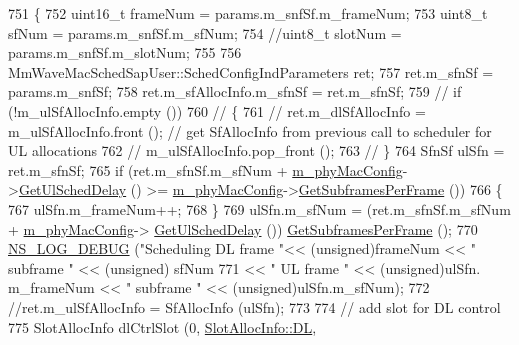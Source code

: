 \begin{DoxyCode}
751 \{
752         uint16\_t frameNum = params.m\_snfSf.m\_frameNum;
753         uint8\_t sfNum = params.m\_snfSf.m\_sfNum;
754         \textcolor{comment}{//uint8\_t slotNum = params.m\_snfSf.m\_slotNum;}
755 
756         MmWaveMacSchedSapUser::SchedConfigIndParameters ret;
757         ret.m\_sfnSf = params.m\_snfSf;
758         ret.m\_sfAllocInfo.m\_sfnSf = ret.m\_sfnSf;
759         \textcolor{comment}{//      if (!m\_ulSfAllocInfo.empty ())}
760         \textcolor{comment}{//      \{}
761         \textcolor{comment}{//              ret.m\_dlSfAllocInfo = m\_ulSfAllocInfo.front ();  // get SfAllocInfo from previous
       call to scheduler for UL allocations}
762         \textcolor{comment}{//              m\_ulSfAllocInfo.pop\_front ();}
763         \textcolor{comment}{//      \}}
764         SfnSf ulSfn = ret.m\_sfnSf;
765         \textcolor{keywordflow}{if} (ret.m\_sfnSf.m\_sfNum + \hyperlink{classns3_1_1MmWaveMacScheduler_a24d7af4971d2e500fe543cefbafa2fd9}{m\_phyMacConfig}->\hyperlink{classns3_1_1MmWavePhyMacCommon_afd70935ec71838fefe6a8e18198f19cb}{GetUlSchedDelay} () >=  
      \hyperlink{classns3_1_1MmWaveMacScheduler_a24d7af4971d2e500fe543cefbafa2fd9}{m\_phyMacConfig}->\hyperlink{classns3_1_1MmWavePhyMacCommon_a3709cf52f6813eb8ad1af16d95082dc1}{GetSubframesPerFrame} ())
766         \{
767                 ulSfn.m\_frameNum++;
768         \}
769         ulSfn.m\_sfNum = (ret.m\_sfnSf.m\_sfNum + \hyperlink{classns3_1_1MmWaveMacScheduler_a24d7af4971d2e500fe543cefbafa2fd9}{m\_phyMacConfig}->
      \hyperlink{classns3_1_1MmWavePhyMacCommon_afd70935ec71838fefe6a8e18198f19cb}{GetUlSchedDelay} ()) %
      \hyperlink{classns3_1_1MmWavePhyMacCommon_a3709cf52f6813eb8ad1af16d95082dc1}{GetSubframesPerFrame} ();
770         \hyperlink{group__logging_ga413f1886406d49f59a6a0a89b77b4d0a}{NS\_LOG\_DEBUG} (\textcolor{stringliteral}{"Scheduling DL frame "}<< (\textcolor{keywordtype}{unsigned})frameNum << \textcolor{stringliteral}{" subframe "} << (\textcolor{keywordtype}{unsigned})
      sfNum
771                                                                 << \textcolor{stringliteral}{" UL frame "} << (\textcolor{keywordtype}{unsigned})ulSfn.
      m\_frameNum << \textcolor{stringliteral}{" subframe "} << (\textcolor{keywordtype}{unsigned})ulSfn.m\_sfNum);
772         \textcolor{comment}{//ret.m\_ulSfAllocInfo = SfAllocInfo (ulSfn);}
773 
774         \textcolor{comment}{// add slot for DL control}
775         SlotAllocInfo dlCtrlSlot (0, \hyperlink{structns3_1_1SlotAllocInfo_a6cad60db1d39034f1851e2cea625fe5da9a365c9c56b7c32dcae38ee1a468ce6d}{SlotAllocInfo::DL}, 

\end{DoxyCode}
